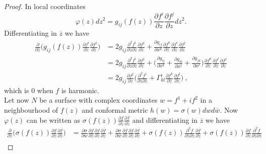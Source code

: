 \begin{proof}
    In local coordinates
    \[
        \varphi(z)dz^2 = g_{ij}(f(z)) \frac{\partial f^i}{\partial z}  \frac{\partial f^j}{\partial z} dz^2. 
    \]
    Differentiating in $\overline{z}$ we have
    \[
    \begin{split}
       \frac{ \partial}{\partial \overline{z}} \Big(g_{ij}(f(z)) \frac{\partial f^i}{\partial z}  \frac{\partial f^j}{\partial z} \Big) & = 2 g_{ij} \frac{\partial^2 f^i}{\partial z \partial \overline{z}} \frac{\partial f^j}{\partial z} + \frac{\partial g_{ij}}{\partial x^k} \frac{\partial f^k}{\partial \overline{z}} \frac{\partial f^i}{\partial z} \frac{\partial f^j}{\partial z} \\
       & = 2 g_{ij} \frac{\partial^2 f^i}{\partial z \partial \overline{z}} \frac{\partial f^j}{\partial z} + \Big(\frac{\partial g_{lj}}{\partial x^k} + \frac{\partial g_{lk}}{\partial x^j} + \frac{\partial g_{jk}}{\partial x^l} \Big) \frac{\partial f^k}{\partial \overline{z}} \frac{\partial f^l}{\partial z} \frac{\partial f^j}{\partial z}  \\
       & = 2 g_{ij} \frac{\partial f^j}{\partial z} \Big( \frac{\partial^2 f^i}{\partial z \partial \overline{z}} + \Gamma^i_{kl}  \frac{\partial f^k}{\partial \overline{z}} \frac{\partial f^l}{\partial z} \Big) \ ,
    \end{split}
    \]
    which is $0$ when $f$ is harmonic.\\
    Let now $N$ be a surface with complex coordinates $w = f^1 + if^2$ in a neighbourhood of $f(z)$ and conformal metric $h(w) = \sigma(w) dw d\overline{w}$. Now $\varphi(z)$ can be written as $\sigma(f(z)) \frac{\partial f}{ \partial z} \frac{\partial \overline{f}}{\partial z}$ and differentiating in $\overline{z}$ we have
    \[
    \begin{split}
        \frac{ \partial}{\partial \overline{z}}\Big(\sigma(f(z)) \frac{\partial f}{ \partial z}  \frac{\partial \overline{f}}{\partial z} \Big) & = 
        \frac{\partial \sigma}{\partial w} \frac{\partial f}{\partial \overline{z}} \frac{\partial f}{ \partial z} \frac{\partial \overline{f}}{\partial z} +
        \frac{\partial \sigma}{\partial \overline{w}} \frac{\partial \overline{f}}{\partial \overline{z}} \frac{\partial f}{ \partial z} \frac{\partial \overline{f}}{\partial z} +
        \sigma(f(z)) \frac{\partial^2 f}{\partial \overline{z} \partial z} \frac{\partial \overline{f}}{\partial z} +
        \sigma(f(z)) \frac{\partial f}{ \partial z} \frac{\partial^2 \overline{f}}{\partial \overline{z} \partial z} \\

\end{split}\]
\end{proof}
